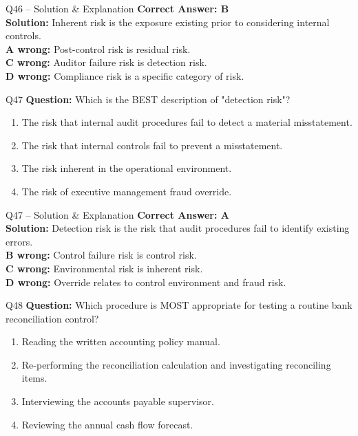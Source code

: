 \documentclass[aspectratio=169,10pt]{beamer}
\begin{document}
	\begin{frame}[t]{Q46 -- Solution \& Explanation}
		\small
		\textbf{Correct Answer: B} \\[4pt]
		\textbf{Solution:} Inherent risk is the exposure existing prior to considering internal controls. \\[4pt]
		\textbf{A wrong:} Post-control risk is residual risk. \\[2pt]
		\textbf{C wrong:} Auditor failure risk is detection risk. \\[2pt]
		\textbf{D wrong:} Compliance risk is a specific category of risk.
	\end{frame}
	
	\begin{frame}[t]{Q47}
		\small
		\textbf{Question:} Which is the BEST description of "detection risk"?
		\begin{enumerate}[label=\Alph*.,itemsep=1pt,topsep=2pt]
			\item The risk that internal audit procedures fail to detect a material misstatement.
			\item The risk that internal controls fail to prevent a misstatement.
			\item The risk inherent in the operational environment.
			\item The risk of executive management fraud override.
		\end{enumerate}
	\end{frame}
	
	\begin{frame}[t]{Q47 -- Solution \& Explanation}
		\small
		\textbf{Correct Answer: A} \\[4pt]
		\textbf{Solution:} Detection risk is the risk that audit procedures fail to identify existing errors. \\[4pt]
		\textbf{B wrong:} Control failure risk is control risk. \\[2pt]
		\textbf{C wrong:} Environmental risk is inherent risk. \\[2pt]
		\textbf{D wrong:} Override relates to control environment and fraud risk.
	\end{frame}
	
	\begin{frame}[t]{Q48}
		\small
		\textbf{Question:} Which procedure is MOST appropriate for testing a routine bank reconciliation control?
		\begin{enumerate}[label=\Alph*.,itemsep=1pt,topsep=2pt]
			\item Reading the written accounting policy manual.
			\item Re-performing the reconciliation calculation and investigating reconciling items.
			\item Interviewing the accounts payable supervisor.
			\item Reviewing the annual cash flow forecast.
		\end{enumerate}
	\end{frame}
	
\end{document}
